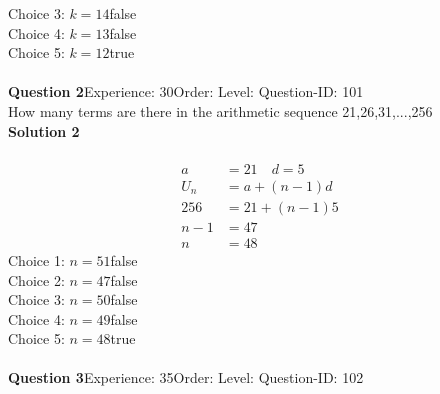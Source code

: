 \documentclass{article}
\begin{document}
Choice 3: \hspace{20pt}$k=14$\hspace{20pt}false\\
Choice 4: \hspace{20pt}$k=13$\hspace{20pt}false\\
Choice 5: \hspace{20pt}$k=12$\hspace{20pt}true\\
\\[4pt]
\noindent\textbf{Question 2}\hspace{20pt}Experience: 30\hspace{20pt}Order: \hspace{20pt}Level: \hspace{20pt}Question-ID: 101\\[2pt]
How many terms are there in the arithmetic sequence 21,26,31,...,256\\[4pt]
\noindent\textbf{Solution 2}\\[2pt]
\\[-35pt]\begin{align*}
a&=21 \quad d=5\\[2pt]
U_n&=a+(n-1)d\\[2pt]
256&=21+(n-1)5\\[2pt]
n-1&=47\\[2pt]
n&=48
\end{align*}
Choice 1: \hspace{20pt}$n=51$\hspace{20pt}false\\
Choice 2: \hspace{20pt}$n=47$\hspace{20pt}false\\
Choice 3: \hspace{20pt}$n=50$\hspace{20pt}false\\
Choice 4: \hspace{20pt}$n=49$\hspace{20pt}false\\
Choice 5: \hspace{20pt}$n=48$\hspace{20pt}true\\
\\[4pt]
\noindent\textbf{Question 3}\hspace{20pt}Experience: 35\hspace{20pt}Order: \hspace{20pt}Level: \hspace{20pt}Question-ID: 102\\[2pt]
\end{document}
